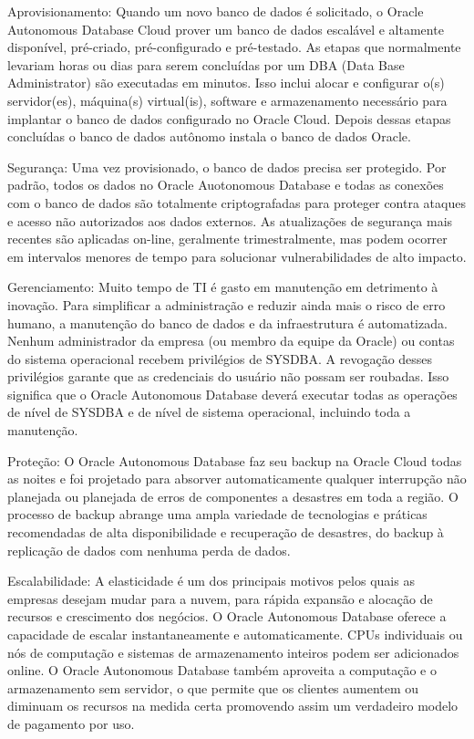 \begin{alineas}
\item Aprovisionamento: Quando um novo banco de dados é solicitado, o Oracle Autonomous Database Cloud prover um banco de dados escalável e altamente disponível, pré-criado, pré-configurado e pré-testado. As etapas que normalmente levariam horas ou dias para serem concluídas por um DBA (Data Base Administrator) são executadas em minutos. Isso inclui alocar e configurar o(s) servidor(es), máquina(s) virtual(is),  software e armazenamento necessário para implantar o banco de dados configurado no Oracle Cloud. Depois dessas etapas concluídas o banco de dados autônomo instala o banco de dados Oracle.

\item Segurança: Uma vez provisionado, o banco de dados precisa ser protegido. Por padrão, todos os dados no Oracle Auotonomous Database e todas as conexões com o banco de dados são totalmente criptografadas para proteger contra ataques e acesso não autorizados aos dados externos. As atualizações de segurança mais recentes são aplicadas on-line, geralmente trimestralmente, mas podem ocorrer em intervalos menores de tempo para solucionar vulnerabilidades de alto impacto.

\item Gerenciamento: Muito tempo de TI é gasto em manutenção em detrimento à inovação. Para simplificar a administração e reduzir ainda mais o risco de erro humano, a manutenção do banco de dados e da infraestrutura é automatizada. Nenhum administrador da empresa (ou membro da equipe da Oracle) ou contas do sistema operacional recebem privilégios de SYSDBA. A revogação desses privilégios garante que as credenciais do usuário não possam ser roubadas. Isso significa que o Oracle Autonomous Database deverá executar todas as operações de nível de SYSDBA e de nível de sistema operacional, incluindo toda a manutenção.

\item Proteção: O Oracle Autonomous Database faz seu backup na Oracle Cloud todas as noites e foi projetado para absorver automaticamente qualquer interrupção não planejada ou planejada de erros de componentes a desastres em toda a região. O processo de backup abrange uma ampla variedade de tecnologias e práticas recomendadas de alta disponibilidade e recuperação de desastres, do backup à replicação de dados com nenhuma perda de dados. 

\item Escalabilidade: A elasticidade é um dos principais motivos pelos quais as empresas desejam mudar para a nuvem, para rápida expansão e alocação de recursos e crescimento dos negócios. O Oracle Autonomous Database oferece a capacidade de escalar instantaneamente e automaticamente. CPUs individuais ou nós de computação e sistemas de armazenamento inteiros podem ser adicionados online. O Oracle Autonomous Database também aproveita a computação e o armazenamento sem servidor, o que permite que os clientes aumentem ou diminuam os recursos na medida certa promovendo assim um verdadeiro modelo de pagamento por uso.


\end{alineas}
